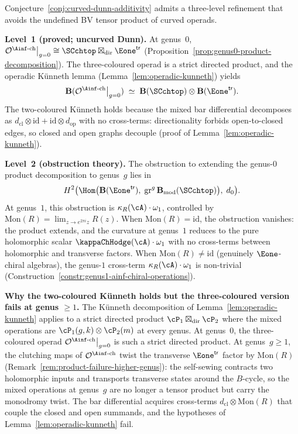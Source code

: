 \begin{remark}
\label{rem:curved-dunn-three-level}
Conjecture~\ref{conj:curved-dunn-additivity} admits a
three-level refinement that avoids the undefined
BV tensor product of curved operads.

\medskip\noindent
\textbf{Level~1 (proved; uncurved Dunn).}
At genus~$0$,
$\mathcal{O}^{\Ainf\text{-ch}}\big|_{g=0}
\cong \SCchtop\boxtimes_{\mathrm{dir}}\Eone^{\mathsf{tr}}$
(Proposition~\ref{prop:genus0-product-decomposition}).
The three-coloured operad is a strict directed product, and the
operadic K\"unneth lemma
(Lemma~\ref{lem:operadic-kunneth}) yields
\[
 \mathbf{B}(\mathcal{O}^{\Ainf\text{-ch}}\big|_{g=0})
 \;\simeq\;
 \mathbf{B}(\SCchtop)
 \otimes \mathbf{B}(\Eone^{\mathsf{tr}}).
\]
The two-coloured K\"unneth holds because
the mixed bar differential decomposes as
$d_{\mathrm{cl}} \otimes \mathrm{id}
+ \mathrm{id} \otimes d_{\mathrm{op}}$
with no cross-terms: directionality forbids
open-to-closed edges, so closed and open graphs decouple
(proof of Lemma~\ref{lem:operadic-kunneth}).

\medskip\noindent
\textbf{Level~2 (obstruction theory).}
The obstruction to extending the genus-$0$ product
decomposition to genus~$g$ lies in
\[
 H^2\bigl(
 \Hom\bigl(
 \mathbf{B}(\Eone^{\mathsf{tr}}),\;
 \mathrm{gr}^g\,
 \mathbf{B}_{\mathrm{mod}}(\SCchtop)
 \bigr),\; d_0\bigr).
\]
At genus~$1$, this obstruction is
$\kappa_R(\cA) \cdot \omega_1$, controlled by
$\mathrm{Mon}(R) = \lim_{z \to e^{2\pi i}z} R(z)$.
When $\mathrm{Mon}(R) = \mathrm{id}$, the obstruction
vanishes: the product extends, and the curvature at
genus~$1$ reduces to the pure holomorphic scalar
$\kappaChHodge(\cA) \cdot \omega_1$ with no cross-terms between
holomorphic and transverse factors.
When $\mathrm{Mon}(R) \neq \mathrm{id}$
(genuinely $\Eone$-chiral algebras), the
genus-$1$ cross-term $\kappa_R(\cA) \cdot \omega_1$ is
non-trivial
(Construction~\ref{constr:genus1-ainf-chiral-operations}).

\medskip\noindent
\textbf{Why the two-coloured K\"unneth holds but the
three-coloured version fails at genus $\ge 1$.}
The K\"unneth decomposition of
Lemma~\ref{lem:operadic-kunneth} applies to a strict
directed product $\cP_1 \boxtimes_{\mathrm{dir}}\cP_2$ where the
mixed operations are $\cP_1(g,k) \otimes \cP_2(m)$ at every genus.
At genus~$0$, the three-coloured operad
$\mathcal{O}^{\Ainf\text{-ch}}\big|_{g=0}$ is such a
strict directed product. At genus~$g \ge 1$, the clutching maps
of $\mathcal{O}^{\Ainf\text{-ch}}$ twist the transverse
$\Eone^{\mathsf{tr}}$ factor by $\mathrm{Mon}(R)$
(Remark~\ref{rem:product-failure-higher-genus}):
the self-sewing contracts two holomorphic inputs
and transports transverse states around the $B$-cycle,
so the mixed operations at genus~$g$ are no longer
a tensor product but carry the monodromy twist.
The bar differential acquires cross-terms
$d_{\mathrm{cl}} \otimes \mathrm{Mon}(R)$
that couple the closed and open summands,
and the hypotheses of
Lemma~\ref{lem:operadic-kunneth} fail.


\end{remark}
